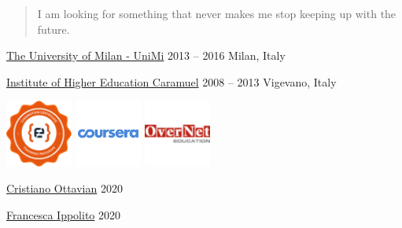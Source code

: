 \begin{quote}
  I am looking for something that never makes me stop keeping up with the future.
\end{quote}
\vspace{1mm}


{\href{https://www.unimi.it/}{The University of Milan - UniMi}}
{2013 -- 2016}
{Milan, Italy}

{\href{https://www.caramuelroncalli.it/}{Institute of Higher Education Caramuel}}
{2008 -- 2013}
{Vigevano, Italy}


\includegraphics[width=2.2cm]{badges/gcp-codemotion-badge}
\includegraphics[width=2.2cm]{badges/coursera}
\includegraphics[width=2.2cm]{badges/overnet}

{\href{https://www.linkedin.com/in/cristiano-ottavian-0724085}{Cristiano Ottavian}}
{2020}

{\href{https://www.linkedin.com/in/francescaippolito/}{Francesca Ippolito}}
{2020}

\vspace{2mm}

\vspace{2mm}
\divider\smallskip

\vspace{2mm}